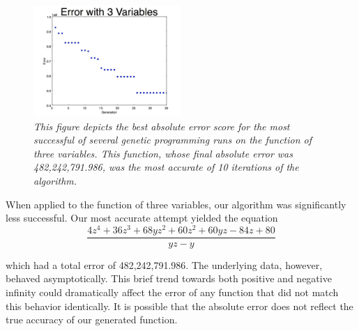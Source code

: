 \begin{figure}[htb]

  \centering  %

  \includegraphics[width=0.5\textwidth]{figs/ThreeVariables.jpg}

  \caption{\emph{This figure depicts the best absolute error score for the most successful of several genetic programming runs on the function of three variables. This function, whose final absolute error was 482,242,791.986, was the most accurate of 10 iterations of the algorithm.}}


  \label{fig:tex}

\end{figure}

When applied to the function of three variables, our algorithm was significantly less successful. Our most accurate attempt yielded the equation $$\frac{4z^4+36z^3+68yz^2+60z^2+60yz-84z+80}{yz-y}$$

 which had a total error of 482,242,791.986. The underlying data, however, behaved asymptotically. This brief trend towards both positive and negative infinity could dramatically affect the error of any function that did not match this behavior identically. It is possible that the absolute error does not reflect the true accuracy of our generated function. 


